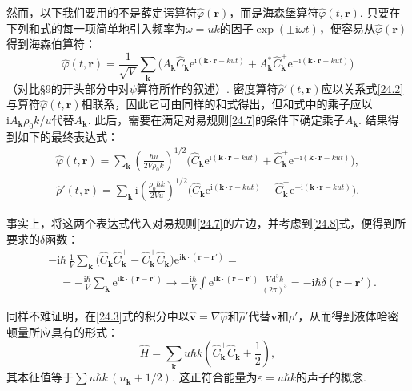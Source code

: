 然而，以下我们要用的不是薛定谔算符$\hat{\varphi}(\bm{r})$，而是海森堡算符$\hat{\varphi}(t,\bm{r})$. 只要在下列和式的每一项简单地引入频率为$\omega=uk$的因子$\exp(\pm\mathrm{i}\omega t)$，便容易从$\hat{\varphi}(\bm{r})$得到海森伯算符：
\begin{equation*}
\hat{\varphi}(t,\bm{r})=\frac{1}{\sqrt{V}}\sum_{\bm{k}}
\bigl(A_{\bm{k}}\hat{C}_{\bm{k}}\mathrm{e}^{\mathrm{i}(\bm{k}\cdot\bm{r}-kut)}
+A^{*}_{\bm{k}}\hat{C}^{+}_{\bm{k}}\mathrm{e}^{-\mathrm{i}(\bm{k}\cdot\bm{r}-kut)}\bigr)
\end{equation*}
（对比§9的开头部分中对$\psi$算符所作的叙述）. 密度算符$\hat{\rho}'(t,\bm{r})$应以关系式\eqref{24.2}与算符$\hat{\varphi}(t,\bm{r})$相联系，因此它可由同样的和式得出，但和式中的乘子应以$\mathrm{i}A_{\bm{k}}\rho_{0}k/u$代替$A_{\bm{k}}$. 此后，需要在满足对易规则\eqref{24.7}的条件下确定乘子$A_{\bm{k}}$. 结果得到如下的最终表达式：
\begin{equation}
\begin{gathered}
\hat{\varphi}(t,\bm{r})=\sum_{\bm{k}}\left(\frac{\hbar u}{2V\rho_{0}k}\right)^{1/2}
\bigl(\hat{C}_{\bm{k}}\mathrm{e}^{\mathrm{i}(\bm{k}\cdot\bm{r}-kut)}
+\hat{C}^{+}_{\bm{k}}\mathrm{e}^{-\mathrm{i}(\bm{k}\cdot\bm{r}-kut)}\bigr),\\
\hat{\rho}'(t,\bm{r})=\sum_{\bm{k}}\mathrm{i}\left(\frac{\rho_{0}\hbar k}{2Vu}\right)^{1/2}
\bigl(\hat{C}_{\bm{k}}\mathrm{e}^{\mathrm{i}(\bm{k}\cdot\bm{r}-kut)}
-\hat{C}^{+}_{\bm{k}}\mathrm{e}^{-\mathrm{i}(\bm{k}\cdot\bm{r}-kut)}\bigr).
\end{gathered}
\label{24.10}
\end{equation}

事实上，将这两个表达式代入对易规则\eqref{24.7}的左边，并考虑到\eqref{24.8}式，便得到所要求的$\delta$函数：
\begin{equation*}
\begin{aligned}
&-\mathrm{i}\hbar\,\frac{1}{V}\sum_{\bm{k}}
\bigl(\hat{C}_{\bm{k}}\hat{C}^{+}_{\bm{k}}-\hat{C}^{+}_{\bm{k}}\hat{C}_{\bm{k}}\bigr)
\mathrm{e}^{\mathrm{i}\bm{k}\cdot(\bm{r}-\bm{r}')}={}\\
&\quad=-\frac{\mathrm{i}\hbar}{V}\sum_{\bm{k}}\mathrm{e}^{\mathrm{i}\bm{k}\cdot(\bm{r}-\bm{r}')}
\longrightarrow-\frac{\mathrm{i}\hbar}{V}\int\mathrm{e}^{\mathrm{i}\bm{k}\cdot(\bm{r}-\bm{r}')}\,
\frac{V\,\mathrm{d}^{3}k}{(2\pi)^{3}}
=-\mathrm{i}\hbar\delta(\bm{r}-\bm{r}').
\end{aligned}
\end{equation*}

同样不难证明，在\eqref{24.3}式的积分中以$\hat{\bm{v}}=\nabla\hat{\varphi}$和$\hat{\rho}'$代替$\bm{v}$和$\rho'$，从而得到液体哈密顿量所应具有的形式：
\begin{equation*}
\hat{H}=\sum_{\bm{k}}u\hbar k\left(\hat{C}^{+}_{\bm{k}}\hat{C}_{\bm{k}}+\frac{1}{2}\right),
\end{equation*}
其本征值等于$\sum u\hbar k\,(n_{\bm{k}}+1/2)$. 这正符合能量为$\varepsilon=u\hbar k$的声子的概念.

